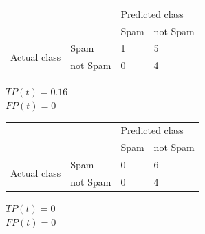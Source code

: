 \documentclass[a4paper]{article}
\theoremstyle{definition}
\newenvironment{soln}{
    \leavevmode\color{blue}\ignorespaces
}{}
\begin{document}
\begin{enumerate}
\begin{enumerate}
\begin{soln}
                  \begin{center}
                     \label{tab:title}
                    \begin{tabular}{l l | l l}
                                                    &          & \multicolumn{2}{l}{Predicted class}            \\
                                                    &          & Spam                                & not Spam \\
                      \hline
                      \multirow{2}{*}{Actual class} & Spam     & 1                                   & 5        \\
                                                    & not Spam & 0                                   & 4
                    \end{tabular}
                  \end{center}
                  $TP(t) = 0.16$\\
                  $FP(t) = 0$

                  \begin{center}
                     \label{tab:title}
                    \begin{tabular}{l l | l l}
                                                    &          & \multicolumn{2}{l}{Predicted class}            \\
                                                    &          & Spam                                & not Spam \\
                      \hline
                      \multirow{2}{*}{Actual class} & Spam     & 0                                   & 6        \\
                                                    & not Spam & 0                                   & 4
                    \end{tabular}
                  \end{center}
                  $TP(t) = 0$\\
                  $FP(t) = 0$






\end{soln}
\end{enumerate}
\end{enumerate}
\end{document}
